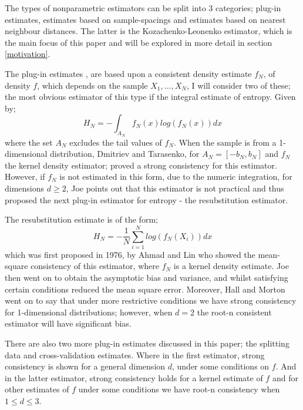 \documentclass{report}
\begin{document}
The types of nonparametric estimators can be split into 3 categories; plug-in estimates, estimates based on sample-spacings and estimates based on nearest neighbour distances. The latter is the Kozachenko-Leonenko estimator, which is the main focus of this paper and will be explored in more detail in section \ref{motivation}.

The plug-in estimates \cite{paper10}, \cite{paper7} are based upon a consistent density estimate $f_{N}$, of density $f$, which depends on the sample $X_{1}, ..., X_{N}$, I will consider two of these; the most obvious estimator of this type if the integral estimate of entropy. Given by;
\begin{equation}
H_{N} = - \int_{A_{N}} f_{N}(x) log ( f_{N}(x) )dx
\end{equation}
where the set $A_{N}$ excludes the tail values of $f_{N}$. When the sample is from a 1-dimensional distribution, Dmitriev and Tarasenko, \cite{intest1} for $A_{N} = [-b_{N}, b_{N}]$ and $f_{N}$ the kernel density estimator; proved a strong consistency for this estimator. However, if $f_{N}$ is not estimated in this form, due to the numeric integration, for dimensions $d \geq 2$, Joe \cite{intest2} points out that this estimator is not practical and thus proposed the next plug-in estimator for entropy - the resubstitution estimator.

The resubstitution estimate is of the form;
\begin{equation}
H_{N} = - \frac{1}{N}\sum_{i=1}^{N}  log ( f_{N}(X_{i}) )dx
\end{equation}
which was first proposed in 1976, by Ahmad and Lin \cite{resest1} who showed the mean-square consistency of this estimator, where  $f_{N}$ is a kernel density estimate. Joe \cite{intest2} then went on to obtain the asymptotic bias and variance, and whilst satisfying certain conditions reduced the mean square error. Moreover, Hall and Morton \cite{resest2} went on to say that under more restrictive conditions we have strong consistency for 1-dimensional distributions; however, when $d=2$ the root-n consistent estimator will have significant bias.

There are also two more plug-in estimates discussed in this paper; the splitting data and cross-validation estimates. Where in the first estimator, strong consistency is shown for a general dimension $d$, under some conditions on $f$. And in the latter estimator, strong consistency holds for a kernel estimate of $f$ and for other estimates of $f$ under some conditions we have root-n consistency when $1 \leq d \leq 3$.
\end{document}
